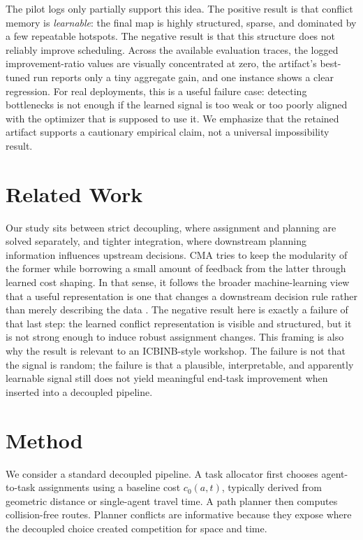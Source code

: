 \documentclass{article} %
\begin{document}
The pilot logs only partially support this idea. The positive result is that conflict memory is \emph{learnable}: the final map is highly structured, sparse, and dominated by a few repeatable hotspots. The negative result is that this structure does not reliably improve scheduling. Across the available evaluation traces, the logged improvement-ratio values are visually concentrated at zero, the artifact's best-tuned run reports only a tiny aggregate gain, and one instance shows a clear regression. For real deployments, this is a useful failure case: detecting bottlenecks is not enough if the learned signal is too weak or too poorly aligned with the optimizer that is supposed to use it. We emphasize that the retained artifact supports a cautionary empirical claim, not a universal impossibility result.

\section{Related Work}
\label{sec:related}

Our study sits between strict decoupling, where assignment and planning are solved separately, and tighter integration, where downstream planning information influences upstream decisions. CMA tries to keep the modularity of the former while borrowing a small amount of feedback from the latter through learned cost shaping. In that sense, it follows the broader machine-learning view that a useful representation is one that changes a downstream decision rule rather than merely describing the data \citep{goodfellow2016deep}. The negative result here is exactly a failure of that last step: the learned conflict representation is visible and structured, but it is not strong enough to induce robust assignment changes. This framing is also why the result is relevant to an ICBINB-style workshop. The failure is not that the signal is random; the failure is that a plausible, interpretable, and apparently learnable signal still does not yield meaningful end-task improvement when inserted into a decoupled pipeline.

\section{Method}
\label{sec:method}

We consider a standard decoupled pipeline. A task allocator first chooses agent-to-task assignments using a baseline cost $c_0(a,t)$, typically derived from geometric distance or single-agent travel time. A path planner then computes collision-free routes. Planner conflicts are informative because they expose where the decoupled choice created competition for space and time.
\end{document}
